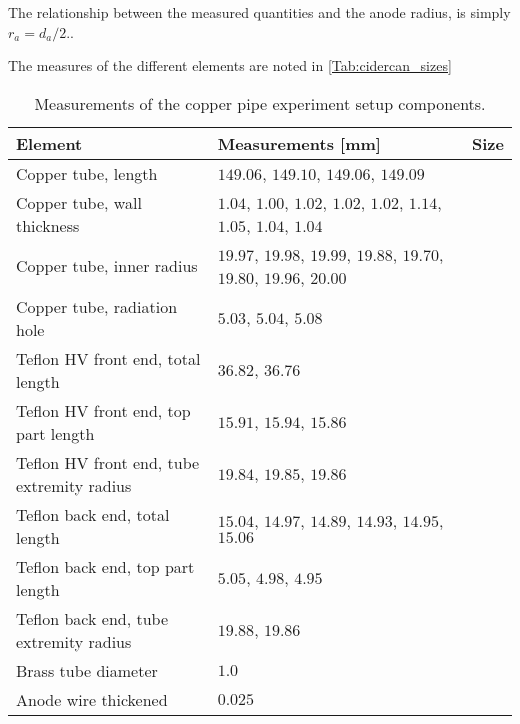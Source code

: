 The relationship between the measured quantities and the anode radius, is simply $r_{a} = d_{a}/2.$.



The measures of the different elements are noted in \ref{Tab:cidercan_sizes}


\begin{table}[]
	\begin{tabularx}{\linewidth}{X|X|p{2cm}}
		\textbf{Element} & \textbf{Measurements} {[}mm{]}                                                  & \textbf{Size} \\ \hline
		Copper tube, length                        & $149.06$, $149.10$, $149.06$, $149.09$                                 &      \\
		Copper tube, wall thickness                & $1.04$, $1.00$, $1.02$, $1.02$, $1.02$, $1.14$, $1.05$, $1.04$, $1.04$ &      \\
		Copper tube, inner radius                  & $19.97$, $19.98$, $19.99$, $19.88$, $19.70$, $19.80$, $19.96$, $20.00$ &      \\
		Copper tube, radiation hole                & $5.03$, $5.04$, $5.08$                                                 &      \\
		Teflon HV front end,  total length         & $36.82$, $36.76$                                                       &      \\
		Teflon HV front end, top part length       & $15.91$, $15.94$, $15.86$                                              &      \\
		Teflon HV front end, tube extremity radius & $19.84$, $19.85$, $19.86$                                              &      \\
		Teflon back end, total length              & $15.04$, $14.97$, $14.89$, $14.93$, $14.95$, $15.06$                   &      \\
		Teflon back end, top part length           & $5.05$, $4.98$, $4.95$                                                 &      \\
		Teflon back end, tube extremity radius     & $19.88$, $19.86$                                                       &      \\
		Brass tube diameter                        & $1.0$                                                                  &      \\
		Anode wire thickened                       & $0.025$                                                                &     
	\end{tabularx}
\caption{Measurements of the copper pipe experiment setup components.}
\label{Tab:coppercan_sizes}
\end{table}
